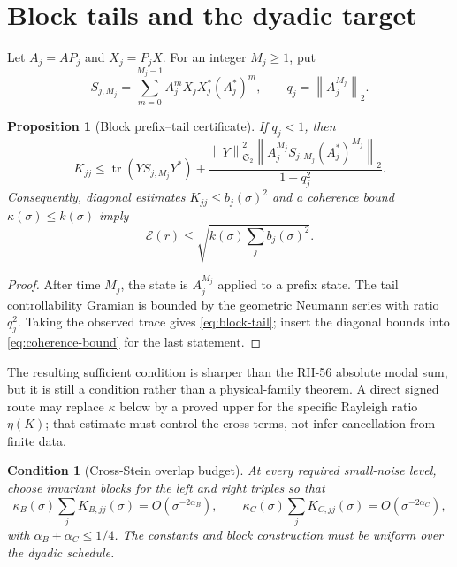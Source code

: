 \documentclass[11pt]{article}
\newtheorem{proposition}[theorem]{Proposition}
\newtheorem{condition}[theorem]{Condition}
\theoremstyle{remark}
\newcommand{\norm}[1]{\left\lVert#1\right\rVert}
\newcommand{\HS}{\mathfrak S_2}
\newcommand{\cE}{\mathcal E}
\newcommand{\tr}{\operatorname{tr}}
\begin{document}
\section{Block tails and the dyadic target}
\label{sec:target}

Let $A_j=AP_j$ and $X_j=P_jX$.  For an integer $M_j\ge1$, put
\begin{equation}
 S_{j,M_j}=\sum_{m=0}^{M_j-1}A_j^mX_jX_j^*(A_j^*)^m,
 \qquad q_j=\norm{A_j^{M_j}}_2.
 \label{eq:block-prefix}
\end{equation}

\begin{proposition}[Block prefix--tail certificate]
\label{prop:block-tail}
If $q_j<1$, then
\begin{equation}
 K_{jj}\le\tr(YS_{j,M_j}Y^*)+
 \frac{\norm{Y}_{\HS}^2\norm{A_j^{M_j}S_{j,M_j}(A_j^*)^{M_j}}_2}
 {1-q_j^2}.
 \label{eq:block-tail}
\end{equation}
Consequently, diagonal estimates $K_{jj}\le b_j(\sigma)^2$ and a coherence
bound $\kappa(\sigma)\le k(\sigma)$ imply
\begin{equation}
 \cE(r)\le\sqrt{k(\sigma)\sum_jb_j(\sigma)^2}.
 \label{eq:finite-block-target}
\end{equation}
\end{proposition}

\begin{proof}
After time $M_j$, the state is $A_j^{M_j}$ applied to a prefix state.  The
tail controllability Gramian is bounded by the geometric Neumann series with
ratio $q_j^2$.  Taking the observed trace gives \eqref{eq:block-tail}; insert
the diagonal bounds into \eqref{eq:coherence-bound} for the last statement.
\end{proof}

The resulting sufficient condition is sharper than the RH-56 absolute modal
sum, but it is still a condition rather than a physical-family theorem.  A
direct signed route may replace $\kappa$ below by a proved upper for the
specific Rayleigh ratio $\eta(K)$; that estimate must control the cross terms,
not infer cancellation from finite data.

\begin{condition}[Cross-Stein overlap budget]
\label{cond:cross-budget}
At every required small-noise level, choose invariant blocks for the left and
right triples so that
\begin{equation}
 \kappa_B(\sigma)\sum_jK_{B,jj}(\sigma)=O(\sigma^{-2\alpha_B}),
 \qquad
 \kappa_C(\sigma)\sum_jK_{C,jj}(\sigma)=O(\sigma^{-2\alpha_C}),
 \label{eq:cross-budget}
\end{equation}
with $\alpha_B+\alpha_C\le1/4$.  The constants and block construction must
be uniform over the dyadic schedule.
\end{condition}
\end{document}

